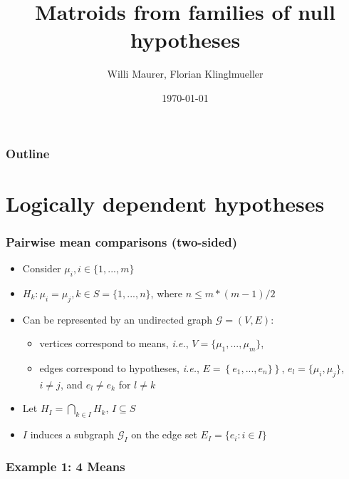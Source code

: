 \documentclass[bigger]{beamer}
\title{Matroids from families of null hypotheses}
\author{Willi Maurer, Florian Klinglmueller}
\date{\today}
\begin{document}
\maketitle



\begin{frame}
\frametitle{Outline}
\setcounter{tocdepth}{3}
\tableofcontents
\end{frame}




\section{Logically dependent hypotheses}


\begin{frame}
\frametitle{Pairwise mean comparisons (two-sided)}
\begin{itemize}

\item Consider $\mu_i, i \in \{1,...,m\}$

\item $H_k: \mu_i = \mu_j, k \in S = \{1,...,n\}$, where $n \leq m*(m-1)/2$

\item Can be represented by an undirected graph $\mathscr{G} = (V,E)$:
\begin{itemize}
\item vertices correspond to means, \emph{i.e.}, $V = \{\mu_1,...,\mu_m\}$,
\item edges correspond to hypotheses, \emph{i.e.}, $E =
      \left\{e_1,...,e_n\} \right\}$, $e_l = \{\mu_i,\mu_j\}$, $i \neq
      j$, and $e_l \neq e_k$ for $l \neq k$
\end{itemize}
\item Let $H_I = \bigcap_{k \in I} H_k$, $I \subseteq S$
\item $I$ induces a subgraph $\mathscr{G}_I$ on the edge set $E_I=\{e_i: i
  \in I\}$
\end{itemize} %
\end{frame}






\begin{frame}
\frametitle{Example 1: 4 Means}

\end{frame}
\end{document}
